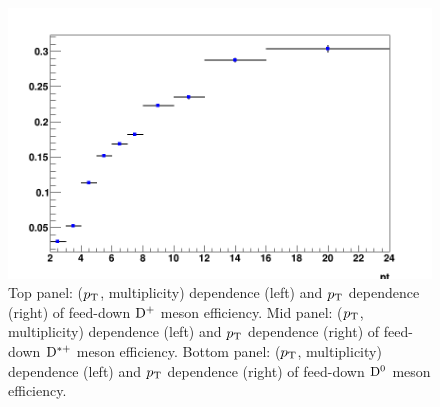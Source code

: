 \begin{figure}[h]
	\includegraphics[width=.48\linewidth]{figures/Effs/EfficiencyMap_1D_Dzero_b_Ref_wLimAcc_Plot.png}
	\caption{Top panel: ($p_{\rm T}$, multiplicity) dependence (left) and $p_{\rm T}$ dependence (right) of feed-down ${\rm D^+}$ meson efficiency.
Mid panel: ($p_{\rm T}$, multiplicity) dependence (left) and $p_{\rm T}$ dependence (right) of feed-down ${\rm D^{*+}}$ meson efficiency.
Bottom panel: ($p_{\rm T}$, multiplicity) dependence (left) and $p_{\rm T}$ dependence (right) of feed-down ${\rm D^0}$ meson efficiency.}
	\label{fig:dEffFD}	
\end{figure}
\clearpage
